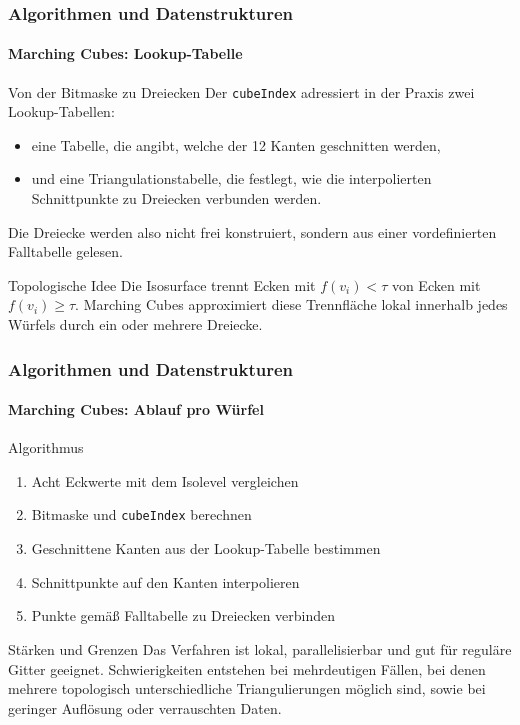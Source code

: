 \documentclass{beamer}
\begin{document}
\begin{frame}
    \frametitle{Algorithmen und Datenstrukturen}
    \framesubtitle{Marching Cubes: Lookup-Tabelle}
    \small
    \begin{block}{Von der Bitmaske zu Dreiecken}
    Der \texttt{cubeIndex} adressiert in der Praxis zwei Lookup-Tabellen:
    \begin{itemize}
        \item eine Tabelle, die angibt, welche der 12 Kanten geschnitten werden,
        \item und eine Triangulationstabelle, die festlegt, wie die
        interpolierten Schnittpunkte zu Dreiecken verbunden werden.
    \end{itemize}
    Die Dreiecke werden also nicht frei konstruiert, sondern aus einer
    vordefinierten Falltabelle gelesen.
    \end{block}

    \begin{block}{Topologische Idee}
    Die Isosurface trennt Ecken mit \(f(v_i) < \tau\) von Ecken mit
    \(f(v_i) \geq \tau\). Marching Cubes approximiert diese Trennfl\"ache lokal
    innerhalb jedes W\"urfels durch ein oder mehrere Dreiecke.
    \end{block}
\end{frame}




\begin{frame}
    \frametitle{Algorithmen und Datenstrukturen}
    \framesubtitle{Marching Cubes: Ablauf pro W\"urfel}
    \small
    \begin{block}{Algorithmus}
    \begin{enumerate}
        \item Acht Eckwerte mit dem Isolevel vergleichen
        \item Bitmaske und \texttt{cubeIndex} berechnen
        \item Geschnittene Kanten aus der Lookup-Tabelle bestimmen
        \item Schnittpunkte auf den Kanten interpolieren
        \item Punkte gem\"a\ss{} Falltabelle zu Dreiecken verbinden
    \end{enumerate}
    \end{block}

    \begin{block}{St\"arken und Grenzen}
    Das Verfahren ist lokal, parallelisierbar und gut f\"ur regul\"are Gitter
    geeignet. Schwierigkeiten entstehen bei mehrdeutigen F\"allen, bei denen
    mehrere topologisch unterschiedliche Triangulierungen m\"oglich sind, sowie
    bei geringer Aufl\"osung oder verrauschten Daten.
    \end{block}
\end{frame}
\end{document}
